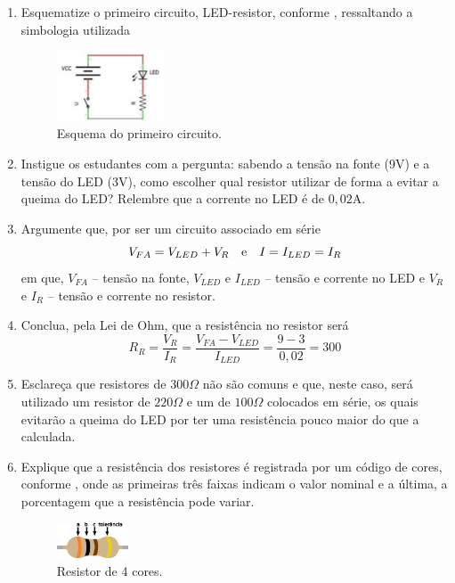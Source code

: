 \documentclass{textolivre-html}
\begin{document}
\begin{enumerate}
\item Esquematize o primeiro circuito, LED-resistor, conforme , ressaltando a simbologia utilizada
\begin{figure}[h!]
\centering
\includegraphics[width=0.3\textwidth]{figure-31.pdf}
\caption{Esquema do primeiro circuito.}
\label{fig21}
\end{figure}

\item Instigue os estudantes com a pergunta: sabendo a tensão na fonte (9V) e a
tensão do LED (3V), como escolher qual resistor utilizar de forma a evitar a
queima do LED?  Relembre que a corrente no LED é de $0,02$A.

\item Argumente que, por ser um circuito associado em série
\begin{equation*}
V_{FA} = V_{LED} + V_R \quad \textmd{e} \quad I = I_{LED} = I_R
\end{equation*}
em que, $V_{FA}$ -- tensão na fonte, $V_{LED}$ e $I_{LED}$ -- tensão e corrente no LED e $V_R$ e $I_R$ -- tensão e corrente no resistor.

\item Conclua, pela Lei de Ohm, que a resistência no resistor será
\begin{equation*}
R_R = \frac{V_R}{I_R} = \frac{V_{FA}-V_{LED}}{I_{LED}} = \frac{9-3}{0,02} = 300
\end{equation*}

\item Esclareça que resistores de $300\Omega$ não são comuns e que, neste caso,
será utilizado um resistor de $220\Omega$ e um de $100\Omega$ colocados em
série, os quais evitarão a queima do LED por ter uma resistência pouco maior do
que a calculada.

\item Explique que a resistência dos resistores é registrada por um código de
cores, conforme , onde as primeiras três faixas indicam o valor
nominal e a última, a porcentagem que a resistência pode variar.

\begin{figure}[h!]
\centering
\includegraphics[width=0.2\textwidth]{figure-32.pdf}
\caption{Resistor de 4 cores.}
\label{fig22}
\end{figure}


\end{enumerate}
\end{document}
